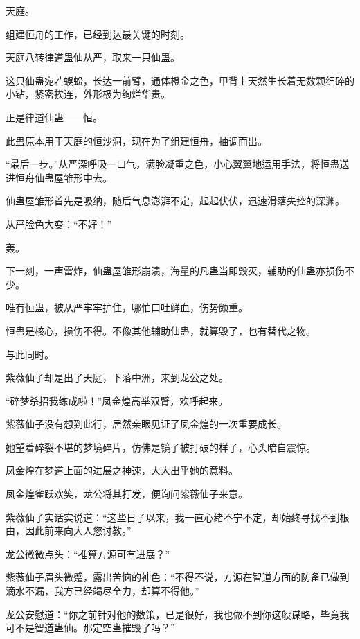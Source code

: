 
\begin{this_body}

天庭。

组建恒舟的工作，已经到达最关键的时刻。

天庭八转律道蛊仙从严，取来一只仙蛊。

这只仙蛊宛若蜈蚣，长达一前臂，通体橙金之色，甲背上天然生长着无数颗细碎的小钻，紧密挨连，外形极为绚烂华贵。

正是律道仙蛊——恒。

此蛊原本用于天庭的恒沙洞，现在为了组建恒舟，抽调而出。

“最后一步。”从严深呼吸一口气，满脸凝重之色，小心翼翼地运用手法，将恒蛊送进恒舟仙蛊屋雏形中去。

仙蛊屋雏形首先是吸纳，随后气息澎湃不定，起起伏伏，迅速滑落失控的深渊。

从严脸色大变：“不好！”

轰。

下一刻，一声雷炸，仙蛊屋雏形崩溃，海量的凡蛊当即毁灭，辅助的仙蛊亦损伤不少。

唯有恒蛊，被从严牢牢护住，哪怕口吐鲜血，伤势颇重。

恒蛊是核心，损伤不得。不像其他辅助仙蛊，就算毁了，也有替代之物。

与此同时。

紫薇仙子却是出了天庭，下落中洲，来到龙公之处。

“碎梦杀招我练成啦！”凤金煌高举双臂，欢呼起来。

紫薇仙子没有想到此行，居然亲眼见证了凤金煌的一次重要成长。

她望着碎裂不堪的梦境碎片，仿佛是镜子被打破的样子，心头暗自震惊。

凤金煌在梦道上面的进展之神速，大大出乎她的意料。

凤金煌雀跃欢笑，龙公将其打发，便询问紫薇仙子来意。

紫薇仙子实话实说道：“这些日子以来，我一直心绪不宁不定，却始终寻找不到根由，因此前来向大人您讨教。”

龙公微微点头：“推算方源可有进展？”

紫薇仙子眉头微蹙，露出苦恼的神色：“不得不说，方源在智道方面的防备已做到滴水不漏，我方已经竭尽全力，却算不得他。”

龙公安慰道：“你之前针对他的数策，已是很好，我也做不到你这般谋略，毕竟我可不是智道蛊仙。那定空蛊摧毁了吗？”


\end{this_body}
